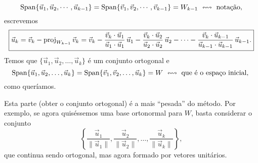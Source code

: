 \documentclass[../livro.tex]{subfiles}  %
\begin{document}
\begin{equation}
\operatorname{Span} \{ \vec{u}_1, \vec{u}_2, \cdots, \vec{u}_{k-1} \} = \operatorname{Span} \{ \vec{v}_1, \vec{v}_2, \cdots, \vec{v}_{k-1} \} = W_{k-1} \ \leftrightsquigarrow \text{ notação,}
\end{equation} escrevemos
\begin{equation}
\boxed{\vec{u}_k = \vec{v}_k - \operatorname{proj}_{W_{k-1}} \vec{v}_k = \vec{v}_k - \frac{\vec{v}_k \cdot \vec{u}_1}{\vec{u}_1 \cdot \vec{u}_1} \, \vec{u}_1 - \frac{\vec{v}_k \cdot \vec{u}_2}{\vec{u}_2 \cdot \vec{u}_2} \, \vec{u}_2 - \cdots - \frac{\vec{v}_k \cdot \vec{u}_{k-1}}{\vec{u}_{k-1} \cdot \vec{u}_{k-1}} \, \vec{u}_{k-1}.}
\end{equation} Temos que $\{\vec{u}_1, \vec{u}_2, \dots, \vec{u}_k\}$ é um conjunto ortogonal e
\begin{equation}
\operatorname{Span} \{ \vec{u}_1, \vec{u}_2, \dots, \vec{u}_k \} = \operatorname{Span} \{ \vec{v}_1, \vec{v}_2, \dots, \vec{u}_k \} = W \ \leftrightsquigarrow \text{ que é o espaço inicial, }
\end{equation} como queríamos.

Esta parte (obter o conjunto ortogonal) é a mais ``pesada'' do método. Por exemplo, se agora quiséssemos uma base ortonormal para $W$, basta considerar o conjunto
\begin{equation}
\left\{ \frac{\vec{u}_1}{\|\vec{u}_1\|}, \frac{\vec{u}_2}{\|\vec{u}_2\|}, \dots, \frac{\vec{u}_k}{\|\vec{u}_k\|} \right\},
\end{equation} que continua sendo ortogonal, mas agora formado por vetores unitários.
\end{document}
